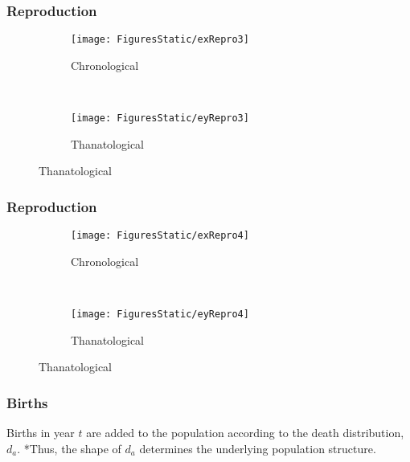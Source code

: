 \documentclass{beamer}
\begin{document}
\begin{frame}
\frametitle{Reproduction}
\vspace{-5em}
\begin{figure}
        \centering
        \begin{subfigure}[b]{0.5\textwidth}
                \centering
                \caption*{Chronological}
                \texttt{[image: FiguresStatic/exRepro3]}
        \end{subfigure}%
        ~ %
        \begin{subfigure}[b]{0.5\textwidth}
                \centering
                \caption*{Thanatological}
                \texttt{[image: FiguresStatic/eyRepro3]}
        \end{subfigure}
\end{figure}
\end{frame}

\begin{frame}
\frametitle{Reproduction}
\vspace{-5em}
\begin{figure}
        \centering
        \begin{subfigure}[b]{0.5\textwidth}
                \centering
                \caption*{Chronological}
                \texttt{[image: FiguresStatic/exRepro4]}
        \end{subfigure}%
        ~ %
        \begin{subfigure}[b]{0.5\textwidth}
                \centering
                \caption*{Thanatological}
                \texttt{[image: FiguresStatic/eyRepro4]}
        \end{subfigure}
\end{figure}
\end{frame}
\begin{frame}
\frametitle{Births}
\begin{center}
Births in year $t$ are added to the population according to the death
distribution, $d_a$.
\vskip2pt
\pause
*Thus, the shape of $d_a$ determines the underlying population structure.
\end{center}
\end{frame}
\end{document}
